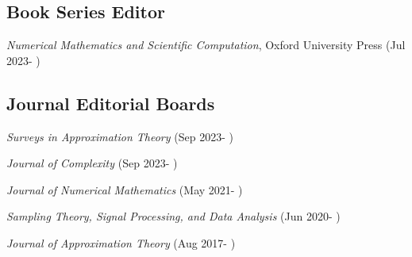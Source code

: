 \documentclass[11pt]{article}
\begin{document}
\subsection{Book Series Editor}

\bitemize
\item
{\em Numerical Mathematics and Scientific Computation}, Oxford University Press (Jul 2023- )
\eitemize

\subsection{Journal Editorial Boards}

\bitemize
\item 
{\sl Surveys in Approximation Theory} (Sep 2023- )
\item 
{\sl Journal of Complexity} (Sep 2023- )
\item
{\sl Journal of Numerical Mathematics} (May 2021- )
\item
{\sl Sampling Theory, Signal Processing, and Data Analysis} (Jun 2020- )
\item
{\sl Journal of Approximation Theory} (Aug 2017- )
\eitemize



%
 
\end{document}
